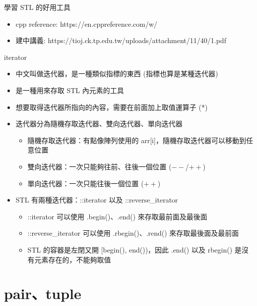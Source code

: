 \documentclass[aspectratio=169]{beamer}
\begin{document}
    \begin{frame}{學習 STL 的好用工具}
        \begin{itemize}
            \item cpp reference: https://en.cppreference.com/w/
            \item 建中講義: https://tioj.ck.tp.edu.tw/uploads/attachment/11/40/1.pdf
        \end{itemize}

    \end{frame}

    \begin{frame}{iterator}
        \begin{itemize}
            \item<1-> 中文叫做迭代器，是一種類似指標的東西 (指標也算是某種迭代器)
            \item<1-> 是一種用來存取 STL 內元素的工具
            \item<2-> 想要取得迭代器所指向的內容，需要在前面加上取值運算子 (*)
            \item<3-> 迭代器分為隨機存取迭代器、雙向迭代器、單向迭代器
                \begin{itemize}
                    \item<4-> 隨機存取迭代器：有點像陣列使用的 arr[i]，隨機存取迭代器可以移動到任意位置
                    \item<5-> 雙向迭代器：一次只能夠往前、往後一個位置 ($--$/$++$)
                    \item<5-> 單向迭代器：一次只能往後一個位置 ($++$)
                \end{itemize}
            \item<6-> STL 有兩種迭代器：::iterator 以及 ::reverse\_iterator
                \begin{itemize}
                    \item<7-> ::iterator 可以使用 .begin()、.end() 來存取最前面及最後面
                    \item<7-> ::reverse\_iterator 可以使用 .rbegin()、.rend() 來存取最後面及最前面
                    \item<8-> STL 的容器是左閉又開 [begin(), end())，因此 .end() 以及 rbegin() 是沒有元素存在的，不能夠取值
                \end{itemize}
        \end{itemize}
    \end{frame}

    \section{pair、tuple}
\end{document}

